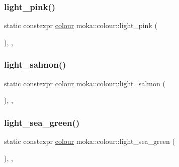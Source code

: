 \mbox{\label{classmoka_1_1colour_a32ba9d7e567cdc58f25c1056ab059762}} 
\subsubsection{\texorpdfstring{light\_pink()}{light\_pink()}}
{\footnotesize\ttfamily static constexpr \mbox{\hyperlink{classmoka_1_1colour}{colour}} moka\+::colour\+::light\+\_\+pink (\begin{DoxyParamCaption}{ }\end{DoxyParamCaption})\hspace{0.3cm}{\ttfamily [inline]}, {\ttfamily [static]}, {\ttfamily [noexcept]}}

\mbox{\label{classmoka_1_1colour_a8ef2d0e1678c2bff8471ea8777396d23}} 
\subsubsection{\texorpdfstring{light\_salmon()}{light\_salmon()}}
{\footnotesize\ttfamily static constexpr \mbox{\hyperlink{classmoka_1_1colour}{colour}} moka\+::colour\+::light\+\_\+salmon (\begin{DoxyParamCaption}{ }\end{DoxyParamCaption})\hspace{0.3cm}{\ttfamily [inline]}, {\ttfamily [static]}, {\ttfamily [noexcept]}}

\mbox{\label{classmoka_1_1colour_a7b358ca1ba1208b73dd2c3d9846462eb}} 
\subsubsection{\texorpdfstring{light\_sea\_green()}{light\_sea\_green()}}
{\footnotesize\ttfamily static constexpr \mbox{\hyperlink{classmoka_1_1colour}{colour}} moka\+::colour\+::light\+\_\+sea\+\_\+green (\begin{DoxyParamCaption}{ }\end{DoxyParamCaption})\hspace{0.3cm}{\ttfamily [inline]}, {\ttfamily [static]}, {\ttfamily [noexcept]}}

